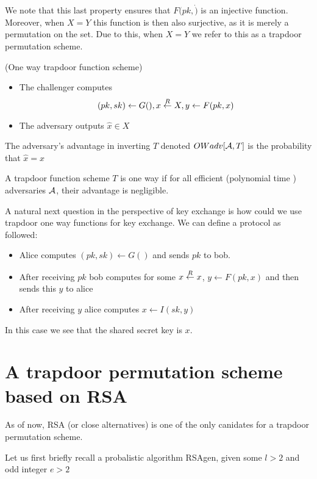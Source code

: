 We note that this last property ensures that \(F(pk, \dot )\) is an injective function.  Moreover, when \(X=Y\) this function is then also surjective, as it is merely a permutation on the set. Due to this, when \(X=Y\) we refer to this as a trapdoor permutation scheme. 

\begin{attackGame} (One way trapdoor function scheme)
    \begin{itemize}
    \item The challenger computes 
    \[
        (pk, sk) \gets G(), x \overset{R}{\gets} X, y \gets F(pk, x)
    \] 
    \item The adversary outputs \(\hat{x} \in X\)
 
    \end{itemize}
    The adversary's advantage in inverting \(T\) denoted \(OWadv[\mathcal{A}, T]\) is the probability that \(\hat{x} = x\)    
\end{attackGame}

\begin{definition}
    A trapdoor function scheme \(T\) is one way if for all efficient (polynomial time ) adversaries \(\mathcal{A}\), their advantage is negligible.    
\end{definition}

A natural next question in the perspective of key exchange is how could we use trapdoor one way functions for key exchange. We can define a protocol as followed:
\begin{itemize}
    \item Alice computes \((pk, sk) \gets G()\) and sends \(pk\) to bob. 
    \item After receiving \(pk\) bob computes  for some \(x \overset{R}{\gets} x\), \(y \gets F(pk, x)\) and then sends this \(y\) to alice 
    \item After receiving \(y\) alice computes \(x \gets I(sk, y)\)       
\end{itemize}
In this case we see that the shared secret key is \(x\). 


\section{A trapdoor permutation scheme based on RSA}
  
As of now, RSA (or close alternatives) is one of the only canidates for a trapdoor permutation scheme. 

Let us first briefly recall a probalistic algorithm RSAgen, given some \(l > 2\) and odd integer \(e > 2\) 

